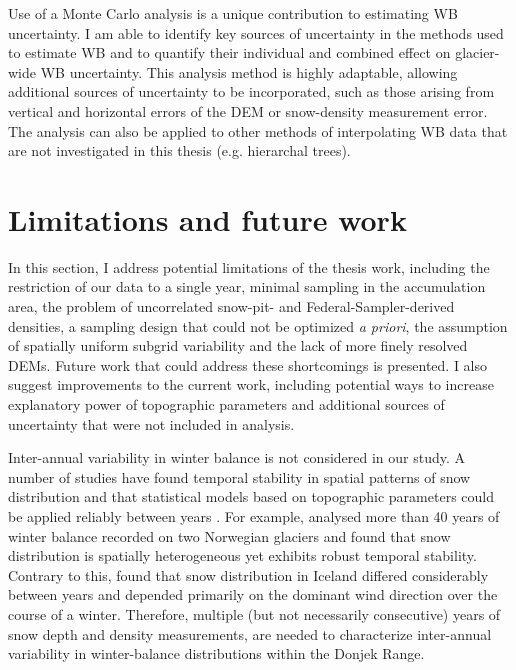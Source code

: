 \documentclass{sfuthesis}
\begin{document}
Use of a Monte Carlo analysis is a unique contribution to estimating WB uncertainty. I am able to identify key sources of uncertainty in the methods used to estimate WB and to quantify their individual and combined effect on glacier-wide WB uncertainty. This analysis method is highly adaptable, allowing additional sources of uncertainty to be incorporated, such as those arising from vertical and horizontal errors of the DEM or snow-density measurement error. The analysis can also be applied to other methods of interpolating WB data that are not investigated in this thesis (e.g. hierarchal trees). 

\section{Limitations and future work}
\label{sec:conc_limitations}

In this section, I address potential limitations of the thesis work, including the restriction of our data to a single year, minimal sampling in the accumulation area, the problem of uncorrelated snow-pit- and Federal-Sampler-derived densities, a sampling design that could not be optimized \textit{a priori}, the assumption of spatially uniform subgrid variability and the lack of more finely resolved DEMs. Future work that could address these shortcomings is presented. I also suggest improvements to the current work, including potential ways to increase explanatory power of topographic parameters and additional sources of uncertainty that were not included in analysis. 

Inter-annual variability in winter balance is not considered in our study. A number of studies have found temporal stability in spatial patterns of snow distribution and that statistical models based on topographic parameters could be applied reliably between years \citep[e.g.][]{Grunewald2013}. For example, \cite{Walmsley2015} analysed more than 40 years of winter balance recorded on two Norwegian glaciers and found that snow distribution is spatially heterogeneous yet exhibits robust temporal stability. Contrary to this, \cite{Crochet2007} found that snow distribution in Iceland differed considerably between years and depended primarily on the dominant wind direction over the course of a winter. Therefore, multiple (but not necessarily consecutive) years of snow depth and density measurements, are needed to characterize inter-annual variability in winter-balance distributions within the Donjek Range.
\end{document}
